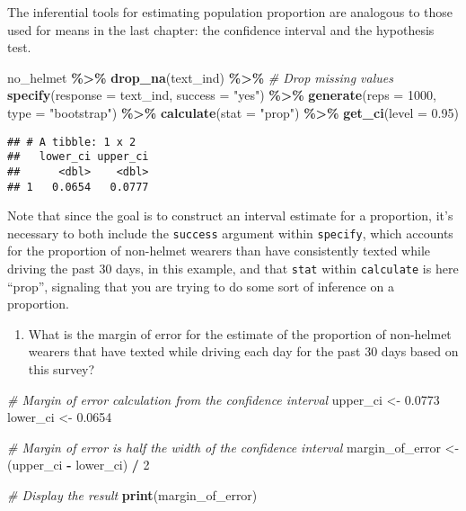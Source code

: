 \documentclass[
]{article}
\newenvironment{Shaded}{\begin{snugshade}}{\end{snugshade}}
\newcommand{\AttributeTok}[1]{\textcolor[rgb]{0.13,0.29,0.53}{#1}}
\newcommand{\CommentTok}[1]{\textcolor[rgb]{0.56,0.35,0.01}{\textit{#1}}}
\newcommand{\DecValTok}[1]{\textcolor[rgb]{0.00,0.00,0.81}{#1}}
\newcommand{\FloatTok}[1]{\textcolor[rgb]{0.00,0.00,0.81}{#1}}
\newcommand{\FunctionTok}[1]{\textcolor[rgb]{0.13,0.29,0.53}{\textbf{#1}}}
\newcommand{\NormalTok}[1]{#1}
\newcommand{\OtherTok}[1]{\textcolor[rgb]{0.56,0.35,0.01}{#1}}
\newcommand{\SpecialCharTok}[1]{\textcolor[rgb]{0.81,0.36,0.00}{\textbf{#1}}}
\newcommand{\StringTok}[1]{\textcolor[rgb]{0.31,0.60,0.02}{#1}}
\providecommand{\tightlist}{%
  \setlength{\itemsep}{0pt}\setlength{\parskip}{0pt}}
\begin{document}
The inferential tools for estimating population proportion are analogous
to those used for means in the last chapter: the confidence interval and
the hypothesis test.

\begin{Shaded}
\begin{Highlighting}[]
\NormalTok{no\_helmet }\SpecialCharTok{\%\textgreater{}\%}
  \FunctionTok{drop\_na}\NormalTok{(text\_ind) }\SpecialCharTok{\%\textgreater{}\%} \CommentTok{\# Drop missing values}
  \FunctionTok{specify}\NormalTok{(}\AttributeTok{response =}\NormalTok{ text\_ind, }\AttributeTok{success =} \StringTok{"yes"}\NormalTok{) }\SpecialCharTok{\%\textgreater{}\%}
  \FunctionTok{generate}\NormalTok{(}\AttributeTok{reps =} \DecValTok{1000}\NormalTok{, }\AttributeTok{type =} \StringTok{"bootstrap"}\NormalTok{) }\SpecialCharTok{\%\textgreater{}\%}
  \FunctionTok{calculate}\NormalTok{(}\AttributeTok{stat =} \StringTok{"prop"}\NormalTok{) }\SpecialCharTok{\%\textgreater{}\%}
  \FunctionTok{get\_ci}\NormalTok{(}\AttributeTok{level =} \FloatTok{0.95}\NormalTok{)}
\end{Highlighting}
\end{Shaded}

\begin{verbatim}
## # A tibble: 1 x 2
##   lower_ci upper_ci
##      <dbl>    <dbl>
## 1   0.0654   0.0777
\end{verbatim}

Note that since the goal is to construct an interval estimate for a
proportion, it's necessary to both include the \texttt{success} argument
within \texttt{specify}, which accounts for the proportion of non-helmet
wearers than have consistently texted while driving the past 30 days, in
this example, and that \texttt{stat} within \texttt{calculate} is here
``prop'', signaling that you are trying to do some sort of inference on
a proportion.

\begin{enumerate}
\def\labelenumi{\arabic{enumi}.}
\setcounter{enumi}{2}
\tightlist
\item
  What is the margin of error for the estimate of the proportion of
  non-helmet wearers that have texted while driving each day for the
  past 30 days based on this survey?
\end{enumerate}

\begin{Shaded}
\begin{Highlighting}[]
\CommentTok{\# Margin of error calculation from the confidence interval}
\NormalTok{upper\_ci }\OtherTok{\textless{}{-}} \FloatTok{0.0773}
\NormalTok{lower\_ci }\OtherTok{\textless{}{-}} \FloatTok{0.0654}

\CommentTok{\# Margin of error is half the width of the confidence interval}
\NormalTok{margin\_of\_error }\OtherTok{\textless{}{-}}\NormalTok{ (upper\_ci }\SpecialCharTok{{-}}\NormalTok{ lower\_ci) }\SpecialCharTok{/} \DecValTok{2}

\CommentTok{\# Display the result}
\FunctionTok{print}\NormalTok{(margin\_of\_error)}
\end{Highlighting}
\end{Shaded}
\end{document}
